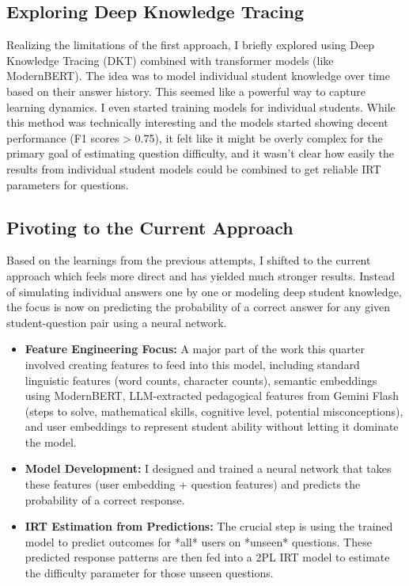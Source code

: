 \documentclass[
    a4paper, %
    10pt, %
    twoside %
]{LTJournalArticle}
\begin{document}
\subsection{Exploring Deep Knowledge Tracing}

Realizing the limitations of the first approach, I briefly explored using Deep Knowledge Tracing (DKT) combined with transformer models (like ModernBERT). The idea was to model individual student knowledge over time based on their answer history. This seemed like a powerful way to capture learning dynamics. I even started training models for individual students. While this method was technically interesting and the models started showing decent performance (F1 scores > 0.75), it felt like it might be overly complex for the primary goal of estimating question difficulty, and it wasn't clear how easily the results from individual student models could be combined to get reliable IRT parameters for questions.

\subsection{Pivoting to the Current Approach}

Based on the learnings from the previous attempts, I shifted to the current approach which feels more direct and has yielded much stronger results. Instead of simulating individual answers one by one or modeling deep student knowledge, the focus is now on predicting the probability of a correct answer for any given student-question pair using a neural network.

\begin{itemize}
    \item \textbf{Feature Engineering Focus:} A major part of the work this quarter involved creating features to feed into this model, including standard linguistic features (word counts, character counts), semantic embeddings using ModernBERT, LLM-extracted pedagogical features from Gemini Flash (steps to solve, mathematical skills, cognitive level, potential misconceptions), and user embeddings to represent student ability without letting it dominate the model.
    \item \textbf{Model Development:} I designed and trained a neural network that takes these features (user embedding + question features) and predicts the probability of a correct response.
    \item \textbf{IRT Estimation from Predictions:} The crucial step is using the trained model to predict outcomes for *all* users on *unseen* questions. These predicted response patterns are then fed into a 2PL IRT model to estimate the difficulty parameter for those unseen questions.
\end{itemize}
\end{document}

